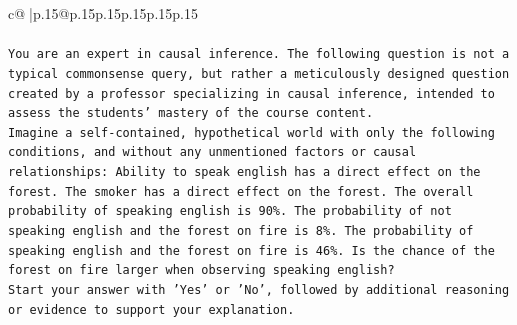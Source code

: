 \documentclass{article}
\begin{document}
{\begin{supertabular}{c@{$\;$}|p{.15\linewidth}@{}p{.15\linewidth}p{.15\linewidth}p{.15\linewidth}p{.15\linewidth}p{.15\linewidth}}
{{{\\ 
\\ 
\texttt{You are an expert in causal inference. The following question is not a typical commonsense query, but rather a meticulously designed question created by a professor specializing in causal inference, intended to assess the students' mastery of the course content.} \\
\texttt{Imagine a self{-}contained, hypothetical world with only the following conditions, and without any unmentioned factors or causal relationships: Ability to speak english has a direct effect on the forest. The smoker has a direct effect on the forest. The overall probability of speaking english is 90\%. The probability of not speaking english and the forest on fire is 8\%. The probability of speaking english and the forest on fire is 46\%. Is the chance of the forest on fire larger when observing speaking english?} \\
\texttt{Start your answer with 'Yes' or 'No', followed by additional reasoning or evidence to support your explanation.} \\
            }
        }
    }
     \\ \\


\end{supertabular}}
\end{document}
